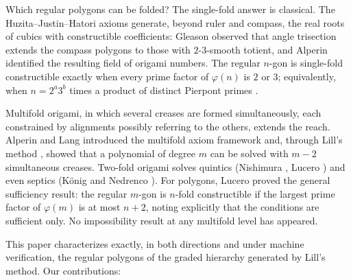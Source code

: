 \documentclass[11pt]{amsart}
\theoremstyle{plain}
\theoremstyle{definition}
\begin{document}
Which regular polygons can be folded? The single-fold answer is classical. The Huzita--Justin--Hatori axioms generate, beyond ruler and compass, the real roots of cubics with constructible coefficients: Gleason \cite{gleason} observed that angle trisection extends the compass polygons to those with $2$-$3$-smooth totient, and Alperin \cite{alperin} identified the resulting field of origami numbers. The regular $n$-gon is single-fold constructible exactly when every prime factor of $\varphi(n)$ is $2$ or $3$; equivalently, when $n = 2^a 3^b$ times a product of distinct Pierpont primes \cite{pierpont}.

Multifold origami, in which several creases are formed simultaneously, each constrained by alignments possibly referring to the others, extends the reach. Alperin and Lang \cite{alperinlang} introduced the multifold axiom framework and, through Lill's method \cite{hull}, showed that a polynomial of degree $m$ can be solved with $m-2$ simultaneous creases. Two-fold origami solves quintics (Nishimura \cite{nishimura}, Lucero \cite{luceroquintic}) and even septics (K\"onig and Nedrenco \cite{koenig}). For polygons, Lucero \cite{lucero} proved the general sufficiency result: the regular $m$-gon is $n$-fold constructible if the largest prime factor of $\varphi(m)$ is at most $n+2$, noting explicitly that the conditions are sufficient only. No impossibility result at any multifold level has appeared.

This paper characterizes exactly, in both directions and under machine verification, the regular polygons of the graded hierarchy generated by Lill's method. Our contributions:
\end{document}
